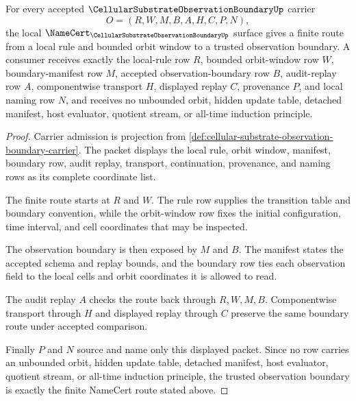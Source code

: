 \begin{theorem}
\label{thm:cellular-trust-substrate-substrate-vision-route}
For every accepted $\CellularSubstrateObservationBoundaryUp$ carrier
$$
O=(R,W,M,B,A,H,C,P,N),
$$
the local $\NameCert_{\CellularSubstrateObservationBoundaryUp}$ surface gives a finite route from a local rule and bounded orbit window to a trusted observation boundary. A consumer receives exactly the local-rule row $R$, bounded orbit-window row $W$, boundary-manifest row $M$, accepted observation-boundary row $B$, audit-replay row $A$, componentwise transport $H$, displayed replay $C$, provenance $P$, and local naming row $N$, and receives no unbounded orbit, hidden update table, detached manifest, host evaluator, quotient stream, or all-time induction principle.
\end{theorem}
\begin{proof}
Carrier admission is projection from \autoref{def:cellular-substrate-observation-boundary-carrier}. The packet displays the local rule, orbit window, manifest, boundary row, audit replay, transport, continuation, provenance, and naming rows as its complete coordinate list.

The finite route starts at $R$ and $W$. The rule row supplies the transition table and boundary convention, while the orbit-window row fixes the initial configuration, time interval, and cell coordinates that may be inspected.

The observation boundary is then exposed by $M$ and $B$. The manifest states the accepted schema and replay bounds, and the boundary row ties each observation field to the local cells and orbit coordinates it is allowed to read.

The audit replay $A$ checks the route back through $R,W,M,B$. Componentwise transport through $H$ and displayed replay through $C$ preserve the same boundary route under accepted comparison.

Finally $P$ and $N$ source and name only this displayed packet. Since no row carries an unbounded orbit, hidden update table, detached manifest, host evaluator, quotient stream, or all-time induction principle, the trusted observation boundary is exactly the finite NameCert route stated above.
\end{proof}


